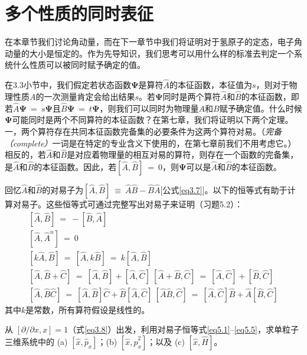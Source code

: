 \documentclass[12pt,a4paper,openany]{ctexbook}
\newcommand{\bp}{\bm{\Psi}}
\begin{document}
\section{多个性质的同时表征}
\begin{flushleft}
    \setlength{\parindent}{2em}
在本章节我们讨论角动量，而在下一章节中我们将证明对于氢原子的定态，电子角动量的大小是恒定的。作为先导知识，我们思考可以用什么样的标准去判定一个系统什么性质可以被同时赋予确定的值。

在3.3小节中，我们假定若状态函数$\bp$是算符$\hat{A}$的本征函数，本征值为$s$，则对于物理性质$A$的一次测量肯定会给出结果$s$。若$\bp$同时是两个算符$\hat{A}$和$\hat{B}$的本征函数，即若$\hat{A}\bp\ =\ s\bp$且$\hat{B}\bp\ =\ t\bp$，则我们可以同时为物理量$A$和$B$赋予确定值。什么时候$\bp$可能同时是两个不同算符的本征函数？在第七章，我们将证明以下两个定理。一，两个算符存在共同本征函数完备集的必要条件为这两个算符对易。（\textit{完备（complete）}一词是在特定的专业含义下使用的，在第七章前我们不用考虑它。）相反的，若$\hat{A}$和$\hat{B}$是对应着物理量的相互对易的算符，则存在一个函数的完备集，是$\hat{A}$和$\hat{B}$的本征函数。因此，若$[\hat{A},\hat{B}]\ =\ 0$，则$\bp$可以是$\hat{A}$和$\hat{B}$的本征函数。

回忆$\hat{A}$和$\hat{B}$的对易子为$[\hat{A},\hat{B}]\ \equiv\ \hat{A}\hat{B}-\hat{B}\hat{A}$[公式\eqref{eq3.7}]。以下的恒等式有助于计算对易子。这些恒等式可通过完整写出对易子来证明（习题5.2）：
\begin{gather}
    \boxed{[\hat{A},\hat{B}]\ =\ -[\hat{B},\hat{A}]} \label{eq5.1} \\
    \boxed{[\hat{A},\hat{A}^n]\ =\ 0} \label{eq5.2} \\
    \boxed{[k\hat{A},\hat{B}]\ =\ [\hat{A},k\hat{B}]\ =\ k[\hat{A},\hat{B}]} \label{eq5.3} \\
    \boxed{[\hat{A},\hat{B}+\hat{C}]\ =\ [\hat{A},\hat{B}]+[\hat{A},\hat{C}]}\ \boxed{[\hat{A}+\hat{B},\hat{C}]\ =\ [\hat{A},\hat{C}]+[\hat{B},\hat{C}]} \label{eq5.4} \\
    \boxed{[\hat{A},\hat{B}\hat{C}]\ =\ [\hat{A},\hat{B}]\hat{C}+\hat{B}[\hat{A},\hat{C}]}\ \boxed{[\hat{A}\hat{B},\hat{C}]\ =\ [\hat{A},\hat{C}]\hat{B}+\hat{A}[\hat{B},\hat{C}]} \label{eq5.5}
\end{gather}
其中$k$是常数，所有算符假设是线性的。

\begin{examplebox}
从 $[\partial/\partial x, x] = 1$（式\eqref{eq3.8}）出发，利用对易子恒等式\eqref{eq5.1}–\eqref{eq5.5}，求单粒子三维系统中的 (a) $[\hat{x}, \hat{p}_x]$；(b) $[\hat{x}, \hat{p}_x^2]$；以及 (c) $[\hat{x}, \hat{H}]$。


\end{examplebox}
\end{flushleft}
\end{document}
